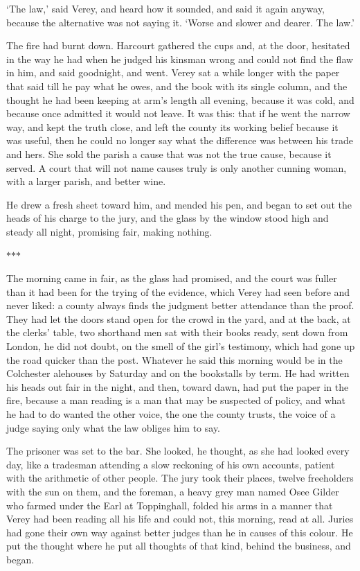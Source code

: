 \documentclass[11pt]{article}
\newcommand{\scenebreak}{%
  \par\vspace{1.1\baselineskip}%
  {\centering $\ast$\quad$\ast$\quad$\ast$\par}%
  \vspace{1.1\baselineskip}\noindent}
\begin{document}
`The law,' said Verey, and heard how it sounded, and said it again anyway, because the alternative was not saying it. `Worse and slower and dearer. The law.'

The fire had burnt down. Harcourt gathered the cups and, at the door, hesitated in the way he had when he judged his kinsman wrong and could not find the flaw in him, and said goodnight, and went. Verey sat a while longer with the paper that said till he pay what he owes, and the book with its single column, and the thought he had been keeping at arm's length all evening, because it was cold, and because once admitted it would not leave. It was this: that if he went the narrow way, and kept the truth close, and left the county its working belief because it was useful, then he could no longer say what the difference was between his trade and hers. She sold the parish a cause that was not the true cause, because it served. A court that will not name causes truly is only another cunning woman, with a larger parish, and better wine.

He drew a fresh sheet toward him, and mended his pen, and began to set out the heads of his charge to the jury, and the glass by the window stood high and steady all night, promising fair, making nothing.

\scenebreak
\noindent The morning came in fair, as the glass had promised, and the court was fuller than it had been for the trying of the evidence, which Verey had seen before and never liked: a county always finds the judgment better attendance than the proof. They had let the doors stand open for the crowd in the yard, and at the back, at the clerks' table, two shorthand men sat with their books ready, sent down from London, he did not doubt, on the smell of the girl's testimony, which had gone up the road quicker than the post. Whatever he said this morning would be in the Colchester alehouses by Saturday and on the bookstalls by term. He had written his heads out fair in the night, and then, toward dawn, had put the paper in the fire, because a man reading is a man that may be suspected of policy, and what he had to do wanted the other voice, the one the county trusts, the voice of a judge saying only what the law obliges him to say.

The prisoner was set to the bar. She looked, he thought, as she had looked every day, like a tradesman attending a slow reckoning of his own accounts, patient with the arithmetic of other people. The jury took their places, twelve freeholders with the sun on them, and the foreman, a heavy grey man named Osee Gilder who farmed under the Earl at Toppinghall, folded his arms in a manner that Verey had been reading all his life and could not, this morning, read at all. Juries had gone their own way against better judges than he in causes of this colour. He put the thought where he put all thoughts of that kind, behind the business, and began.
\end{document}
